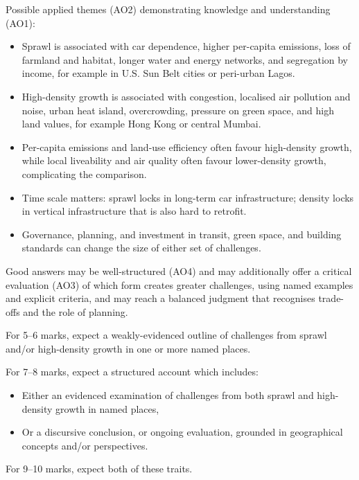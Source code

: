 \documentclass[11pt,a4paper]{article}
\begin{document}
Possible applied themes (AO2) demonstrating knowledge and understanding (AO1):
\begin{itemize}
  \item Sprawl is associated with car dependence, higher per-capita emissions,
  loss of farmland and habitat, longer water and energy networks, and
  segregation by income, for example in U.S. Sun Belt cities or peri-urban
  Lagos.
  \item High-density growth is associated with congestion, localised air
  pollution and noise, urban heat island, overcrowding, pressure on green
  space, and high land values, for example Hong Kong or central Mumbai.
  \item Per-capita emissions and land-use efficiency often favour high-density
  growth, while local liveability and air quality often favour lower-density
  growth, complicating the comparison.
  \item Time scale matters: sprawl locks in long-term car infrastructure;
  density locks in vertical infrastructure that is also hard to retrofit.
  \item Governance, planning, and investment in transit, green space, and
  building standards can change the size of either set of challenges.
\end{itemize}

Good answers may be well-structured (AO4) and may additionally offer a
critical evaluation (AO3) of which form creates greater challenges, using named
examples and explicit criteria, and may reach a balanced judgment that
recognises trade-offs and the role of planning.

For 5--6 marks, expect a weakly-evidenced outline of challenges from sprawl
and/or high-density growth in one or more named places.

For 7--8 marks, expect a structured account which includes:
\begin{itemize}
  \item Either an evidenced examination of challenges from both sprawl and
  high-density growth in named places,
  \item Or a discursive conclusion, or ongoing evaluation, grounded in
  geographical concepts and/or perspectives.
\end{itemize}

For 9--10 marks, expect both of these traits.
\end{document}
